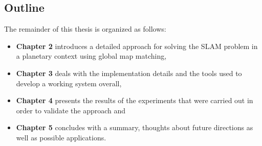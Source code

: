\subsection{Outline}

The remainder of this thesis is organized as follows:
\begin{itemize}
    \item \textbf{Chapter 2} introduces a detailed approach for solving the
        SLAM problem in a planetary context using global map matching,
    \item \textbf{Chapter 3} deals with the implementation details and
        the tools used to develop a working system overall,
    \item \textbf{Chapter 4} presents the results of the experiments that
        were carried out in order to validate the approach and
    \item \textbf{Chapter 5} concludes with a summary, thoughts about future
        directions as well as possible applications.
\end{itemize}

